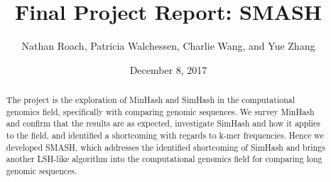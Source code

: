 \documentclass[12pt, letterpaper]{article}
\title{Final Project Report: SMASH}
\author{Nathan Roach, Patricia Walchessen, Charlie Wang, and Yue Zhang}
\date{December 8, 2017}
\begin{document}
\maketitle
\begin{abstract}
The project is the exploration of MinHash and SimHash in the computational genomics field, specifically with comparing genomic sequences. We survey MinHash and confirm that the results are as expected, investigate SimHash and how it applies to the field, and identified a shortcoming with regards to k-mer frequencies. Hence we developed SMASH, which addresses the identified shortcoming of SimHash and brings another LSH-like algorithm into the computational genomics field for comparing long genomic sequences.
\end{abstract}

\end{document}
